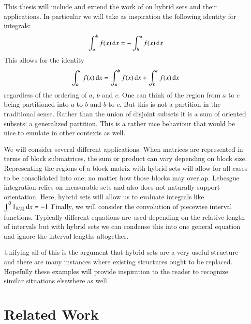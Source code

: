 This thesis will include and extend the work of \cite{carette2010} on hybrid sets and their applications.
In particular we will take as inspiration the following identity for integrals:
\begin{equation}
	\int_a^b f(x) \mathop{}\!\mathrm{d} x = -\int_b^a f(x) \mathop{}\!\mathrm{d} x
\end{equation}
This allows for the identity
\begin{equation}
	\int_a^c f(x) \mathop{}\!\mathrm{d} x = \int_a^b f(x) \mathop{}\!\mathrm{d} x + \int_b^c f(x) \mathop{}\!\mathrm{d} x
\end{equation}
regardless of the ordering of $a$, $b$ and $c$.
One can think of the region from $a$ to $c$ being partitioned into $a$ to $b$ and $b$ to $c$.
But this is not a partition in the traditional sense.
Rather than the union of disjoint subsets it is a sum of oriented subsets: a generalized partition.
This is a rather nice behaviour that would be nice to emulate in other contexts as well.


We will consider several different applications.
When matrices are represented in terms of block submatrices, the sum or product can vary depending on block size.
Representing the regions of a block matrix with hybrid sets will allow for all cases to be consolidated into one;
no matter how those blocks may overlap.
Lebesgue integration relies on measurable sets and also does not naturally support orientation.
Here, hybrid sets will allow us to evaluate integrals like $\int_1^0 1_{\mathbb{R} \setminus \mathbb{Q}} \mathop{}\!\mathrm{d} x = -1$
Finally, we will consider the convolution of piecewise interval functions.
Typically different equations are used depending on the relative length of intervals but with hybrid sets we can condense this
into one general equation and ignore the interval lengths altogether.


Unifying all of this is the argument that hybrid sets are a very useful structure and there are many instances where existing
structures ought to be replaced.
Hopefully these examples will provide inspiration to the reader to recognize similar situations elsewhere as well.




\section{Related Work}


